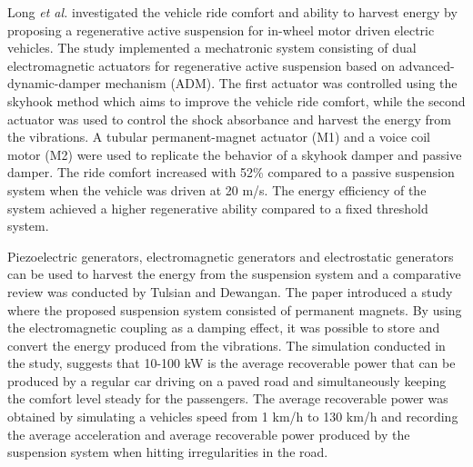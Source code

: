 Long \textit{et al.} investigated the vehicle ride comfort and ability to harvest energy by proposing a regenerative active suspension for in-wheel motor driven electric vehicles\:\cite{longRegenerativeActiveSuspension2020}. The study implemented a mechatronic system consisting of dual electromagnetic actuators for regenerative active suspension based on advanced-dynamic-damper mechanism (ADM). The first actuator was controlled using the skyhook method which aims to improve the vehicle ride comfort, while the second actuator was used to control the shock absorbance and harvest the energy from the vibrations\:\cite{longRegenerativeActiveSuspension2020}. A tubular permanent-magnet actuator (M1) and a voice coil motor (M2) were used to replicate the behavior of a skyhook damper and passive damper\:\cite{longRegenerativeActiveSuspension2020}. The ride comfort increased with 52\% compared to a passive suspension system when the vehicle was driven at 20 m/s. The energy efficiency of the system achieved a higher regenerative ability compared to a fixed threshold system\:\cite{longRegenerativeActiveSuspension2020}.

Piezoelectric generators, electromagnetic generators and electrostatic generators can be used to harvest the energy from the suspension system and a comparative review was conducted by Tulsian and Dewangan\:\cite{tulsianDiscussionEnergyHarvesting2023}. The paper introduced a study\:\cite{jiaAnalyticalNumericalStudy2018} where the proposed suspension system consisted of permanent magnets. By using the electromagnetic coupling as a damping effect, it was possible to store and convert the energy produced from the vibrations\:\cite{tulsianDiscussionEnergyHarvesting2023}\cite{jiaAnalyticalNumericalStudy2018}. The simulation conducted in the study, suggests that 10-100 kW is the average recoverable power that can be produced by a regular car driving on a paved road and simultaneously keeping the comfort level steady for the passengers\:\cite{tulsianDiscussionEnergyHarvesting2023}\cite{jiaAnalyticalNumericalStudy2018}. The average recoverable power was obtained by simulating a vehicles speed from 1 km/h to 130 km/h and recording the average acceleration and average recoverable power produced by the suspension system when hitting irregularities in the road\:\cite{jiaAnalyticalNumericalStudy2018}.

